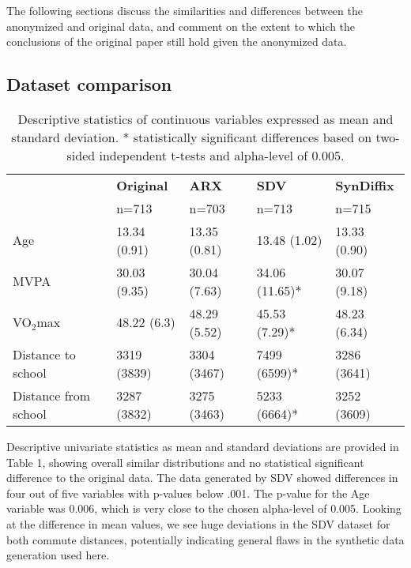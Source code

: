 \documentclass[10pt]{article}
\begin{document}
The following sections discuss the similarities and differences between the anonymized and original data, and comment on the extent to which the conclusions of the original paper still hold given the anonymized data.

\subsection*{Dataset comparison}

\setlength{\fboxsep}{0pt}
\begin{table}
      \begin{center}
      \begin{small}
\begin{tabular}{lllll}
\toprule
 & \textbf{Original}  & \textbf{ARX} & \textbf{SDV} & \textbf{SynDiffix} \\
 & n=713 & n=703  & n=713  & n=715   \\
\midrule
Age & 13.34 (0.91) & 13.35 (0.81)  & 13.48 (1.02)  & 13.33 (0.90) \\
MVPA & 30.03 (9.35) & 30.04 (7.63) & 34.06 (11.65)* & 30.07 (9.18) \\
VO$_2$max & 48.22 (6.3) & 48.29 (5.52)  & 45.53 (7.29)*  & 48.23 (6.34) \\
Distance to school & 3319 (3839) & 3304 (3467) & 7499 (6599)* & 3286 (3641) \\
Distance from school & 3287 (3832) & 3275 (3463) & 5233 (6664)* & 3252 (3609) \\
\bottomrule
\end{tabular}
      \end{small}
      \caption{Descriptive statistics of continuous variables expressed as mean and standard deviation. * statistically significant differences based on two-sided independent t-tests and alpha-level of 0.005.}
      \label{tab:table1}
      \end{center}
      \end{table}
	\setlength{\fboxsep}{3pt}

Descriptive univariate statistics as mean and standard deviations are provided in Table 1, showing overall similar distributions and no statistical significant difference to the original data. The data generated by SDV showed differences in four out of five variables with p-values below .001. The p-value for the Age variable was 0.006, which is very close to the chosen alpha-level of 0.005. Looking at the difference in mean values, we see huge deviations in the SDV dataset for both commute distances, potentially indicating general flaws in the synthetic data generation used here.
\end{document}
